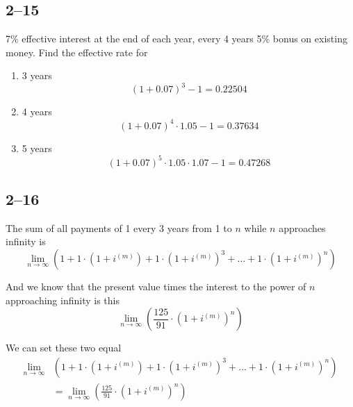 \documentclass[a4paper, 12pt, reqno]{amsart}
\numberwithin{equation}{section}
\begin{document}
\subsection*{2--15}

7\% effective interest at the end of each year, every 4 years 5\% bonus on
existing money. Find the effective rate for 
\begin{enumerate}[label=(\alph*)]
    \item 3 years
        \begin{equation}\nonumber
            (1+0.07)^3 - 1 = 0.22504
        \end{equation}
    \item 4 years
        \begin{equation}\nonumber
            (1+0.07)^4 \cdot 1.05 - 1 = 0.37634
        \end{equation}
    \item 5 years
        \begin{equation}\nonumber
            (1+0.07)^5 \cdot 1.05 \cdot 1.07 - 1 = 0.47268
        \end{equation}
\end{enumerate}

\subsection*{2--16}

The sum of all payments of 1 every 3 years from 1 to $n$ while $n$ approaches
infinity is 
\begin{equation}\nonumber
    \lim_{n\rightarrow\infty} \left( 1 + 1 \cdot \left(1+i^{(m)}\right)
        + 1 \cdot \left(1+i^{(m)}\right)^3 + \dots
        + 1 \cdot \left(1+i^{(m)}\right)^n \right)
\end{equation}

And we know that the present value times the interest to the power of $n$
approaching infinity is this
\begin{equation}\nonumber
    \lim_{n\rightarrow\infty} \left( \frac{125}{91} 
        \cdot \left(1+i^{(m)}\right)^n \right)
\end{equation}

We can set these two equal
\begin{equation}\nonumber
    \begin{aligned}
        \lim_{n\rightarrow\infty} &\left(1 + 1 \cdot \left(1+i^{(m)}\right)
            + 1 \cdot \left(1+i^{(m)}\right)^3 + \dots
            + 1 \cdot \left(1+i^{(m)}\right)^n \right) \\
        &=\lim_{n\rightarrow\infty} \left(\frac{125}{91} \cdot \left(1+i^{(m)}
            \right)^n \right)
    \end{aligned}
\end{equation}
\end{document}
